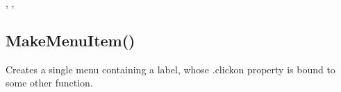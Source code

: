 \documentclass[letterpaper,10pt,english]{sphinxmanual}
\begin{document}
\sphinxAtStartPar
{}

\sphinxAtStartPar
{}, , 

\ignorespaces 

\subsection{MakeMenuItem()}
\label{\detokenize{reference/ui:makemenuitem}}\label{\detokenize{reference/ui:index-16}}
\sphinxAtStartPar
{}

\sphinxAtStartPar
{}

\sphinxAtStartPar
Creates a single menu containing a label, whose .clickon property is bound to some other function.

\sphinxAtStartPar
{}

\begin{sphinxVerbatim}[commandchars=\\\{\}]
\end{sphinxVerbatim}

\sphinxAtStartPar
{}
\end{document}
